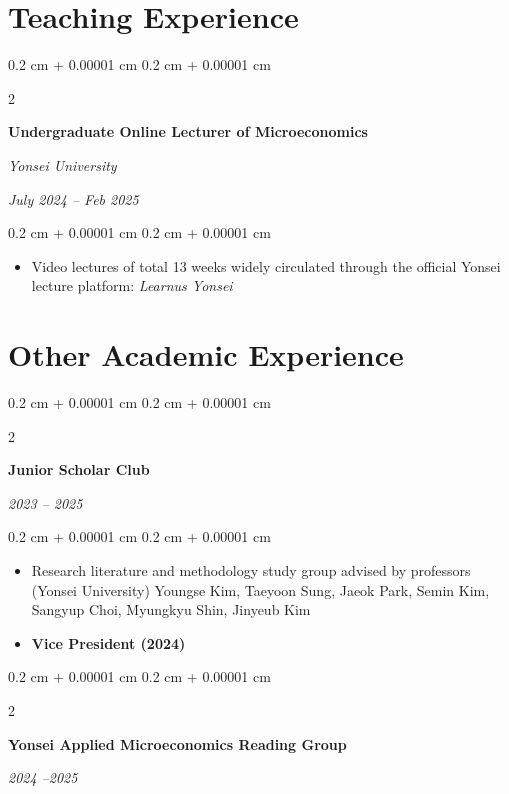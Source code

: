 \documentclass[10pt, letterpaper]{article}
\newenvironment{highlights}{
	\begin{itemize}[
		topsep=0.10 cm,
		parsep=0.10 cm,
		partopsep=0pt,
		itemsep=0pt,
		leftmargin=0.4 cm + 10pt
		]
	}{
	\end{itemize}
} %
\newenvironment{onecolentry}{
	\begin{adjustwidth}{
			0.2 cm + 0.00001 cm
		}{
			0.2 cm + 0.00001 cm
		}
	}{
	\end{adjustwidth}
} %
\newenvironment{twocolentry}[2][]{
	\onecolentry
	\def\secondColumn{#2}
	\setcolumnwidth{\fill, 4.5 cm}
	\begin{paracol}{2}
	}{
		\switchcolumn \raggedleft \secondColumn
	\end{paracol}
	\endonecolentry
} %
\begin{document}
\vspace{12pt}

	
	
	
	\section{Teaching Experience}
		\begin{twocolentry}{
			\textit{July 2024 – Feb 2025}    
			
			\textit{}}
		\textbf{Undergraduate Online Lecturer of Microeconomics}
		
		\textit{Yonsei University}
	\end{twocolentry}
	
	\vspace{0.10 cm}
	\begin{onecolentry}
		\begin{highlights}
			\item Video lectures of total 13 weeks widely circulated through the official Yonsei lecture platform: \textit{Learnus Yonsei}
		\end{highlights}
	\end{onecolentry}
	
	\vspace{12pt}
	
\section{Other Academic Experience}
	
	\begin{twocolentry}{
			
			
			\textit{2023 – 2025}}
		\textbf{Junior Scholar Club}
	\end{twocolentry}
	
	\vspace{0.10 cm}
	\begin{onecolentry}
	\begin{highlights}
		\item Research literature and methodology study group advised by professors (Yonsei University) Youngse Kim, Taeyoon Sung, Jaeok Park, Semin Kim, Sangyup Choi, Myungkyu Shin, Jinyeub Kim
		\item \textbf{Vice President (2024)}
	\end{highlights}
\end{onecolentry}
	
	
	\vspace{0.2 cm}
	
	\begin{twocolentry}{
			
			
			\textit{2024 –2025}}
		\textbf{Yonsei Applied Microeconomics Reading Group}
	\end{twocolentry}
\end{document}
